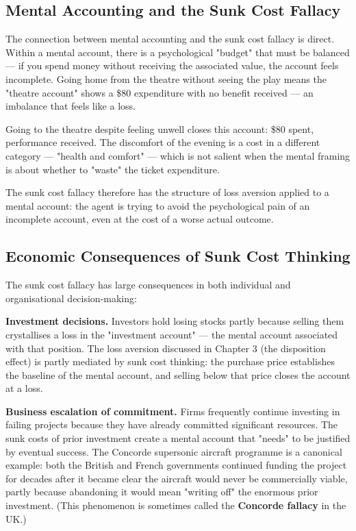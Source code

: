 \documentclass[12pt, letterpaper]{article}
\begin{document}
\subsection{Mental Accounting and the Sunk Cost Fallacy}


The connection between mental accounting and the sunk cost fallacy is direct. Within a mental account, there is a psychological "budget" that must be balanced --- if you spend money without receiving the associated value, the account feels incomplete. Going home from the theatre without seeing the play means the "theatre account" shows a \$80 expenditure with no benefit received --- an imbalance that feels like a loss.

Going to the theatre despite feeling unwell closes this account: \$80 spent, performance received. The discomfort of the evening is a cost in a different category --- "health and comfort" --- which is not salient when the mental framing is about whether to "waste" the ticket expenditure.

The sunk cost fallacy therefore has the structure of loss aversion applied to a mental account: the agent is trying to avoid the psychological pain of an incomplete account, even at the cost of a worse actual outcome.


\subsection{Economic Consequences of Sunk Cost Thinking}


The sunk cost fallacy has large consequences in both individual and organisational decision-making:

\textbf{Investment decisions.} Investors hold losing stocks partly because selling them crystallises a loss in the "investment account" --- the mental account associated with that position. The loss aversion discussed in Chapter 3 (the disposition effect) is partly mediated by sunk cost thinking: the purchase price establishes the baseline of the mental account, and selling below that price closes the account at a loss.

\textbf{Business escalation of commitment.} Firms frequently continue investing in failing projects because they have already committed significant resources. The sunk costs of prior investment create a mental account that "needs" to be justified by eventual success. The Concorde supersonic aircraft programme is a canonical example: both the British and French governments continued funding the project for decades after it became clear the aircraft would never be commercially viable, partly because abandoning it would mean "writing off" the enormous prior investment. (This phenomenon is sometimes called the \textbf{Concorde fallacy} in the UK.)
\end{document}
